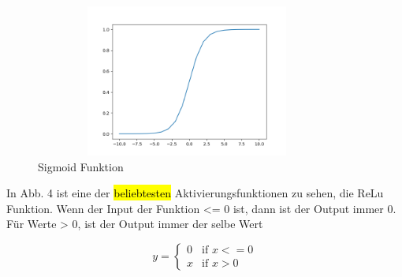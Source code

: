 \begin{figure}
    \centering
    \includegraphics[height= 5cm, width = 10cm]{Pictures/Sigmoid.png}
    \caption{Sigmoid Funktion}
\end{figure}


In Abb. 4 ist eine der \hl{beliebtesten} Aktivierungsfunktionen zu sehen, die ReLu Funktion. Wenn der Input der Funktion <= 0 ist, dann ist der Output immer 0. Für Werte > 0, ist der Output immer der selbe Wert 


\[ y = \left\{ \begin{array}{ll}
         0 & \mbox{if $x <= 0$}\\
	        x & \mbox{if $x > 0$}\end{array} \right. \] 